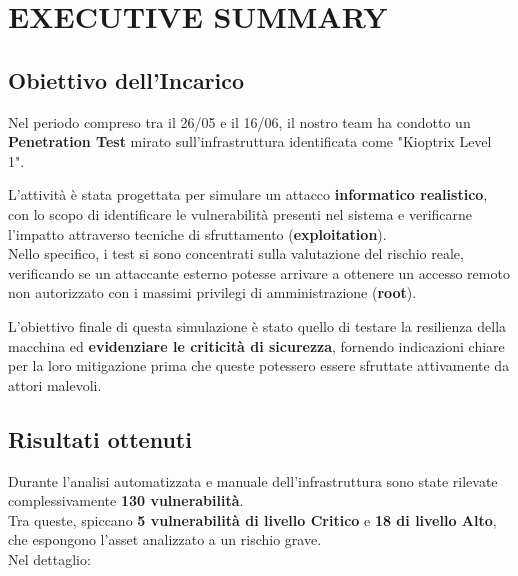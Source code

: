 \documentclass[12pt, a4paper]{article}
\begin{document}
	\newpage
	\thispagestyle{empty}
	\tableofcontents

	\newpage
	\section{EXECUTIVE SUMMARY}
	\subsection{Obiettivo dell'Incarico}
	Nel periodo compreso tra il 26/05 e il 16/06, il nostro team ha condotto un \\ \textbf{Penetration Test} mirato sull'infrastruttura identificata come "Kioptrix Level 1".\\

	\raggedright L'attività è stata progettata per simulare un attacco \textbf{informatico realistico}, con lo scopo di identificare le vulnerabilità presenti nel sistema e verificarne l'impatto attraverso tecniche di sfruttamento (\textbf{exploitation}).\\
	Nello specifico, i test si sono concentrati sulla valutazione del rischio reale, verificando se un attaccante esterno potesse arrivare a ottenere un accesso remoto non autorizzato con i massimi privilegi di amministrazione (\textbf{root}).\newline

	\raggedright L'obiettivo finale di questa simulazione è stato quello di testare la resilienza della macchina ed \textbf{evidenziare le criticità di sicurezza}, 
	fornendo indicazioni chiare per la loro mitigazione prima che queste potessero essere sfruttate attivamente da attori malevoli.
\newline
	
	\subsection{Risultati ottenuti}
	Durante l'analisi automatizzata e manuale dell'infrastruttura sono state rilevate complessivamente \textbf{130 vulnerabilità}.\\
	Tra queste, spiccano \textbf{5 vulnerabilità di livello Critico} e \textbf{18 di livello Alto}, che espongono l'asset analizzato a un rischio grave.\\
	Nel dettaglio:
\end{document}
